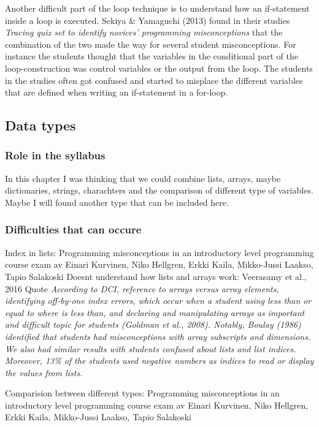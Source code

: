 \documentclass[twocolumn]{article}
\begin{document}
Another difficult part of the loop technique is to understand how an if-statement inside a loop is executed. Sekiya \& Yamaguchi (2013) found in their studies \emph{Tracing quiz set to identify novices' programming misconceptions} that the combination of the two made the way for several student misconceptions. For instance the students thought that the variables in the conditional part of the loop-construction was control variables or the output from the loop. The students in the studies often got confused and started to misplace the different variables that are defined when writing an if-statement in a for-loop.

\subsection{Data types}

\subsubsection{Role in the syllabus}

In this chapter I was thinking that we could combine lists, arrays, maybe dictionaries, strings, charachters and the comparison of different type of variables. Maybe I will found another type that can be included here. 

\subsubsection{Difficulties that can occure}

Index in lists: Programming misconceptions in an introductory level programming course exam av Einari Kurvinen, Niko Hellgren, Erkki Kaila, Mikko-Jussi Laakso, Tapio Salakoski
Doesnt understand how lists and arrays work: Veerasamy et al., 2016 Quote \emph{According to DCI, reference to arrays versus array elements, identifying off-by-one index errors, which occur when a student using less than or equal to where is less than, and declaring and manipulating arrays as important and difficult topic for students (Goldman et al., 2008). Notably, Boulay (1986) identified that students had misconceptions with array subscripts and dimensions. We also had similar results with students confused about lists and list indices. Moreover, 13\% of the students used negative numbers as indices to read or display the values from lists.}

Comparision between different types: Programming misconceptions in an introductory level programming course exam av Einari Kurvinen, Niko Hellgren, Erkki Kaila, Mikko-Jussi Laakso, Tapio Salakoski
\end{document}
